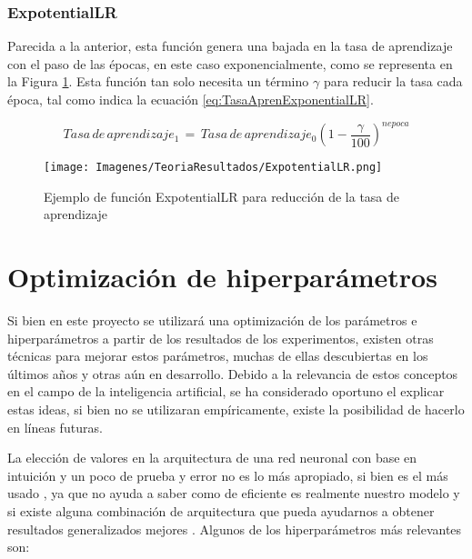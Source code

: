 \documentclass{report}
\begin{document}
\subsubsection{ExpotentialLR}

Parecida a la anterior, esta función genera una bajada en la tasa de aprendizaje con el paso de las épocas, en este caso exponencialmente, como se representa en la Figura \ref{fig:TasaAprendExpo}. Esta función tan solo necesita un término $\gamma$ para reducir la tasa cada época, tal como indica la ecuación \ref{eq:TasaAprenExponentialLR}.

\begin{equation}
    Tasa \, de\, aprendizaje_{1} \,=\, Tasa\, de\, aprendizaje_{0} \left( 1 - \frac{\gamma}{100}  \right)^{n epoca}
    \label{eq:TasaAprenExponentialLR}
\end{equation}

\begin{figure}[hbpt]
      \centering
	 \texttt{[image: Imagenes/TeoriaResultados/ExpotentialLR.png]}
	 \caption{ Ejemplo de función ExpotentialLR para reducción de la tasa de aprendizaje }
	 \label{fig:TasaAprendExpo}
\end{figure}




\newpage
\section{Optimización de hiperparámetros}


Si bien en este proyecto se utilizará una optimización de los parámetros e hiperparámetros a partir de los resultados de los experimentos, existen otras técnicas para mejorar estos parámetros, muchas de ellas descubiertas en los últimos años y otras aún en desarrollo. Debido a la relevancia de estos conceptos en el campo de la inteligencia artificial, se ha considerado oportuno el explicar estas ideas, si bien no se utilizaran empíricamente, existe la posibilidad de hacerlo en líneas futuras.


La elección de valores en la arquitectura de una red neuronal con base en intuición y un poco de prueba y error no es lo más apropiado, si bien es el más usado \cite{OptimizationPaper}, ya que no ayuda a saber como de eficiente es realmente nuestro modelo y si existe alguna combinación de arquitectura que pueda ayudarnos a obtener resultados generalizados mejores \cite{OptimizacionArtBasico}. Algunos de los hiperparámetros más relevantes son: 
\end{document}
